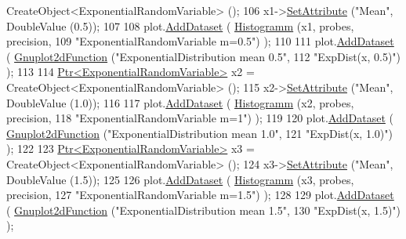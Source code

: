 \begin{DoxyCode}
      CreateObject<ExponentialRandomVariable> ();
106     x1->\hyperlink{classns3_1_1ObjectBase_ac60245d3ea4123bbc9b1d391f1f6592f}{SetAttribute} (\textcolor{stringliteral}{"Mean"}, DoubleValue (0.5));
107 
108     plot.\hyperlink{classns3_1_1Gnuplot_a306ec724a327cf9ab699700f31fca0a1}{AddDataset} ( \hyperlink{main-random-variable_8cc_a2cfd3837ab3f2e816cf53486d7a186b5}{Histogramm} (x1, probes, precision,
109                                   \textcolor{stringliteral}{"ExponentialRandomVariable m=0.5"}) );
110 
111     plot.\hyperlink{classns3_1_1Gnuplot_a306ec724a327cf9ab699700f31fca0a1}{AddDataset} ( \hyperlink{classns3_1_1Gnuplot2dFunction}{Gnuplot2dFunction} (\textcolor{stringliteral}{"ExponentialDistribution mean 0.5"},
112                                          \textcolor{stringliteral}{"ExpDist(x, 0.5)"}) );
113 
114     \hyperlink{classns3_1_1Ptr}{Ptr<ExponentialRandomVariable>} x2 = 
      CreateObject<ExponentialRandomVariable> ();
115     x2->\hyperlink{classns3_1_1ObjectBase_ac60245d3ea4123bbc9b1d391f1f6592f}{SetAttribute} (\textcolor{stringliteral}{"Mean"}, DoubleValue (1.0));
116 
117     plot.\hyperlink{classns3_1_1Gnuplot_a306ec724a327cf9ab699700f31fca0a1}{AddDataset} ( \hyperlink{main-random-variable_8cc_a2cfd3837ab3f2e816cf53486d7a186b5}{Histogramm} (x2, probes, precision,
118                                   \textcolor{stringliteral}{"ExponentialRandomVariable m=1"}) );
119 
120     plot.\hyperlink{classns3_1_1Gnuplot_a306ec724a327cf9ab699700f31fca0a1}{AddDataset} ( \hyperlink{classns3_1_1Gnuplot2dFunction}{Gnuplot2dFunction} (\textcolor{stringliteral}{"ExponentialDistribution mean 1.0"},
121                                          \textcolor{stringliteral}{"ExpDist(x, 1.0)"}) );
122 
123     \hyperlink{classns3_1_1Ptr}{Ptr<ExponentialRandomVariable>} x3 = 
      CreateObject<ExponentialRandomVariable> ();
124     x3->\hyperlink{classns3_1_1ObjectBase_ac60245d3ea4123bbc9b1d391f1f6592f}{SetAttribute} (\textcolor{stringliteral}{"Mean"}, DoubleValue (1.5));
125 
126     plot.\hyperlink{classns3_1_1Gnuplot_a306ec724a327cf9ab699700f31fca0a1}{AddDataset} ( \hyperlink{main-random-variable_8cc_a2cfd3837ab3f2e816cf53486d7a186b5}{Histogramm} (x3, probes, precision,
127                                   \textcolor{stringliteral}{"ExponentialRandomVariable m=1.5"}) );
128 
129     plot.\hyperlink{classns3_1_1Gnuplot_a306ec724a327cf9ab699700f31fca0a1}{AddDataset} ( \hyperlink{classns3_1_1Gnuplot2dFunction}{Gnuplot2dFunction} (\textcolor{stringliteral}{"ExponentialDistribution mean 1.5"},
130                                          \textcolor{stringliteral}{"ExpDist(x, 1.5)"}) );

\end{DoxyCode}

